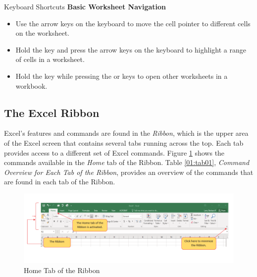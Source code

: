 \begin{center}
	\begin{shtcutbox}{Keyboard Shortcuts}
		\textbf{Basic Worksheet Navigation}
		\\
		\begin{itemize}
			\setlength{\itemsep}{0pt}
			\setlength{\parskip}{0pt}
			\setlength{\parsep}{0pt}

			\item Use the arrow keys on the keyboard to move the cell pointer to different cells on the worksheet.
			\item Hold the  key and press the arrow keys on the keyboard to highlight a range of cells in a worksheet.
			\item Hold the  key while pressing the  or  keys to open other worksheets in a workbook.

		\end{itemize}
	\end{shtcutbox}
\end{center}

\subsection{The Excel Ribbon}

Excel's features and commands are found in the \textit{Ribbon}, which is the upper area of the Excel screen that contains several tabs running across the top. Each tab provides access to a different set of Excel commands. Figure \ref{01:fig06} shows the commands available in the \textit{Home} tab of the Ribbon. Table \ref{01:tab01}, \textit{Command Overview for Each Tab of the Ribbon}, provides an overview of the commands that are found in each tab of the Ribbon.

\begin{figure}[H]
	\centering
	\includegraphics[width=\maxwidth{.95\linewidth}]{gfx/ch01_fig06}
	\caption{Home Tab of the Ribbon}
	\label{01:fig06}
\end{figure}

